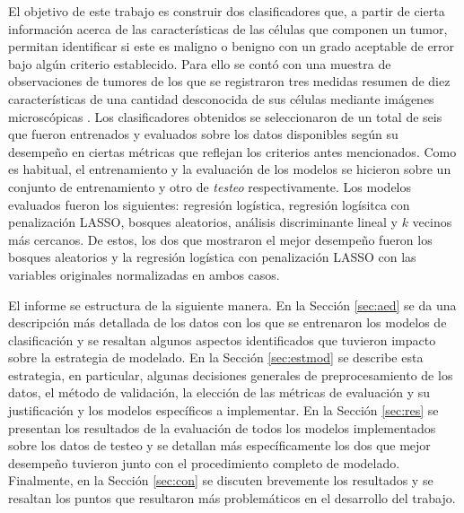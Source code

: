 
El objetivo de este trabajo es construir dos clasificadores que, a partir
de cierta información acerca de las características de las células que componen
un tumor, permitan identificar si este es maligno o benigno con un grado
aceptable de error bajo algún criterio establecido. Para ello se contó con una
muestra de observaciones de tumores de los que se registraron tres medidas
resumen de diez características de una cantidad desconocida de sus células
mediante imágenes microscópicas \parencite{williamwolberg_1993_breast}. Los
clasificadores obtenidos se seleccionaron de un total de seis que fueron
entrenados y evaluados sobre los datos disponibles según su desempeño en
ciertas métricas que reflejan los criterios antes mencionados. Como es
habitual, el entrenamiento y la evaluación de los modelos se hicieron sobre un
conjunto de entrenamiento y otro de \textit{testeo} respectivamente. Los
modelos evaluados fueron los siguientes: regresión logística, regresión
logísitca con penalización LASSO, bosques aleatorios, análisis discriminante
lineal y $k$ vecinos más cercanos. De estos, los dos que mostraron el mejor
desempeño fueron los bosques aleatorios y la regresión logística con
penalización LASSO con las variables originales normalizadas en ambos casos.

El informe se estructura de la siguiente manera. En la Sección \ref{sec:aed} se
da una descripción más detallada de los datos con los que se entrenaron los
modelos de clasificación y se resaltan algunos aspectos identificados que
tuvieron impacto sobre la estrategia de modelado. En la Sección
\ref{sec:estmod} se describe esta estrategia, en particular, algunas decisiones
generales de preprocesamiento de los datos, el método de validación, la
elección de las métricas de evaluación y su justificación y los modelos
específicos a implementar. En la Sección \ref{sec:res} se presentan los
resultados de la evaluación de todos los modelos implementados sobre los datos
de testeo y se detallan más específicamente los dos que mejor desempeño
tuvieron junto con el procedimiento completo de modelado. Finalmente, en la
Sección \ref{sec:con} se discuten brevemente los resultados y se resaltan los
puntos que resultaron más problemáticos en el desarrollo del trabajo.
